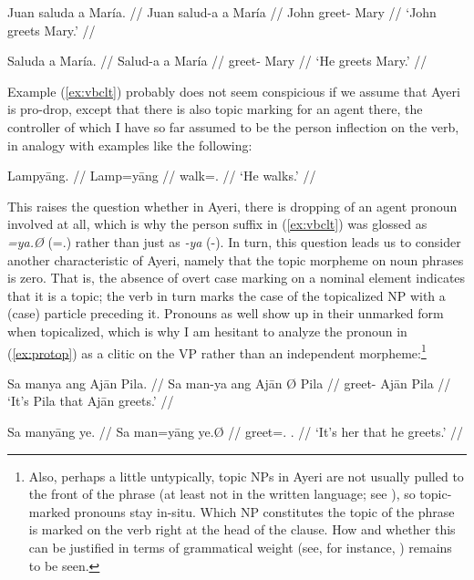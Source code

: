 \pex %
\a\label{ex:vbagrspann}\begingl{}%
	\gla Juan saluda a María. //
	\glb Juan salud-a a María //
	\glc John greet-\Tsg{} \Acc{} Mary //
	\glft `John greets Mary.' //
\endgl

\a\label{ex:vbagrspapr}\begingl
	\gla Saluda a María. //
	\glb Salud-a a María //
	\glc greet-\Tsg{} \Acc{} Mary //
	\glft `He greets Mary.' //
\endgl

\xe

Example (\ref{ex:vbclt}) probably does not seem conspicious if we assume that
Ayeri is pro-drop, except that there is also topic marking for an agent there,
the controller of which I have so far assumed to be the person inflection on
the verb, in analogy with examples like the following:

\ex\label{ex:lampyaang} %
\begingl
	\gla Lampyāng. //
	\glb Lamp=yāng //
	\glc walk=\TsgM{}.\Aarg{} //
	\glft `He walks.' //
\endgl\xe

This raises the question whether in Ayeri, there is dropping of an agent
pronoun involved at all, which is why the person suffix in (\ref{ex:vbclt}) was
glossed as \emph{=ya.Ø} (\mbox{=\TsgM{}.\Top{}}) rather than just as \emph{-ya}
(-\TsgM{}). In turn, this question leads us to consider another characteristic
of Ayeri, namely that the topic morpheme on noun phrases is zero. That is, the
absence of overt case marking on a nominal element indicates that it is a
topic; the verb in turn marks the case of the topicalized NP with a (case)
particle preceding it. Pronouns as well show up in their unmarked form when
topicalized, which is why I am hesitant to analyze the pronoun in
(\ref{ex:protop}) as a clitic on the VP rather than an independent
morpheme:\footnote{Also, perhaps a little untypically, topic NPs in Ayeri are
not usually pulled to the front of the phrase (at least not in the written
language; see \cite[120--122]{lehmann2015}), so topic-marked pronouns stay 
in-situ. Which NP constitutes the topic of the phrase is marked on the verb 
right at the head of the clause. How and whether this can be justified in 
terms of grammatical weight (see, for instance, \cite[95--98]{wasow1997}) 
remains to be seen.}

\pex %
\a\label{ex:fullsntc}\begingl
	\gla Sa manya ang Ajān {} Pila. //
	\glb Sa man-ya ang ​Ajān Ø ​Pila //
	\glc \PatT{} greet-\TsgM{} \Aarg{} ​Ajān \Top{} ​Pila //
	\glft `It's Pila that Ajān greets.' //
\endgl

\a\label{ex:protop}\begingl
	\gla Sa manyāng ye. //
	\glb Sa man=yāng ye.Ø //
	\glc \PatT{} greet=\TsgM{}.\Aarg{} \TsgF{}.\Top{} //
	\glft `It's her that he greets.' //
\endgl

